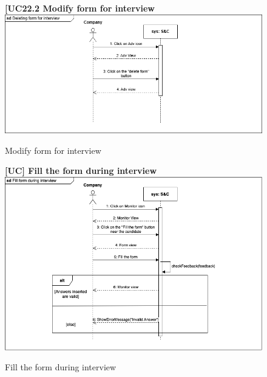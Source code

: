 \begin{figure}[H]
\textbf{[UC22.2 Modify form for interview}\newline\newline
    \includegraphics[width=15cm]{Images/UC_diagram/RASD-UC23.drawio.png}
    \caption{Modify form for interview}
\end{figure}

\begin{figure}[H]
\textbf{[UC\nextUCDiagr] Fill the form during interview}\newline\newline
    \includegraphics[width=15cm]{Images/UC_diagram/RASD-UC_FillInterviewForm.png}
    \caption{Fill the form during interview}
\end{figure}


